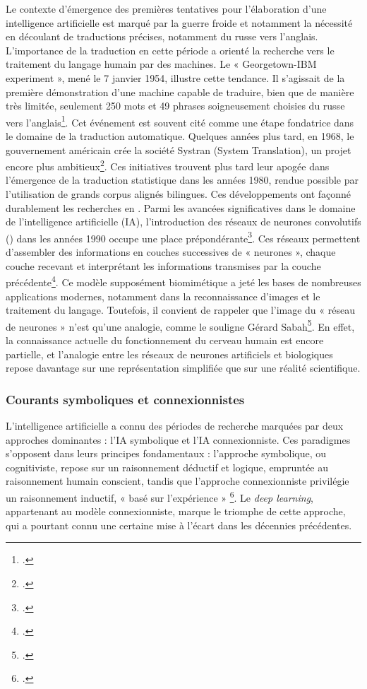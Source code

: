 Le contexte d’émergence des premières tentatives pour l’élaboration d’une intelligence artificielle est marqué par la guerre froide et notamment la nécessité en découlant de traductions précises, notamment du russe vers l'anglais. L'importance de la traduction en cette période a orienté la recherche vers le traitement du langage humain par des machines. Le « Georgetown-IBM experiment », mené le 7 janvier 1954, illustre cette tendance. Il s'agissait de la première démonstration d'une machine capable de traduire, bien que de manière très limitée, seulement 250 mots et 49 phrases soigneusement choisies du russe vers l’anglais\footcite{puren_intelligence_2020}. Cet événement est souvent cité comme une étape fondatrice dans le domaine de la traduction automatique.
Quelques années plus tard, en 1968, le gouvernement américain crée la société Systran (System Translation), un projet encore plus ambitieux\footcite{puren_intelligence_2020}. Ces initiatives trouvent plus tard leur apogée dans l'émergence de la traduction statistique dans les années 1980, rendue possible par l'utilisation de grands corpus alignés bilingues. Ces développements ont façonné durablement les recherches en \tal.
Parmi les avancées significatives dans le domaine de l'intelligence artificielle (IA), l'introduction des réseaux de neurones convolutifs (\cnn) dans les années 1990 occupe une place prépondérante\footcite{puren_intelligence_2020}. Ces réseaux permettent d'assembler des informations en couches successives de « neurones », chaque couche recevant et interprétant les informations transmises par la couche précédente\footcite{puren_intelligence_2020}. Ce modèle supposément biomimétique a jeté les bases de nombreuses applications modernes, notamment dans la reconnaissance d'images et le traitement du langage. Toutefois, il convient de rappeler que l’image du « réseau de neurones » n’est qu’une analogie, comme le souligne \citeauthor{sabah_intelligence_2004}Gérard Sabah\footcite[paragraphe 87]{sabah_intelligence_2004}.  En effet, la connaissance actuelle du fonctionnement du cerveau humain est encore partielle, et l’analogie entre les réseaux de neurones artificiels et biologiques repose davantage sur une représentation simplifiée que sur une réalité scientifique.

\subsubsection{Courants symboliques et connexionnistes}

L'intelligence artificielle a connu des périodes de recherche marquées par deux approches dominantes : l'IA symbolique et l'IA connexionniste. Ces paradigmes s'opposent dans leurs principes fondamentaux : l'approche symbolique, ou cognitiviste, repose sur un raisonnement déductif et logique, empruntée au raisonnement humain conscient, tandis que l'approche connexionniste privilégie un raisonnement inductif, « basé sur l'expérience » \footcite[p.7]{bensamoun_rapport_2020}. Le \textit{deep learning}, appartenant au modèle connexionniste, marque le triomphe de cette approche, qui a pourtant connu une certaine mise à l’écart dans les décennies précédentes.

